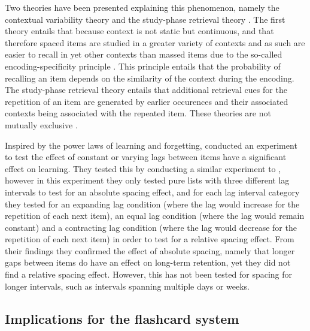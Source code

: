 Two theories have been presented explaining this phenomenon, namely the contextual variability theory and the study-phase retrieval theory \cite{siegel}. The first theory entails that because context is not static but continuous, and that therefore spaced items are studied in a greater variety of contexts and as such are easier to recall in yet other contexts than massed items due to the so-called encoding-specificity principle \cite{cognitivepsychology}. This principle entails that the probability of recalling an item depends on the similarity of the context during the encoding. The study-phase retrieval theory entails that additional retrieval cues for the repetition of an item are generated by earlier occurences and their associated contexts being associated with the repeated item. These theories are not mutually exclusive \cite{siegel}.

Inspired by the power laws of learning and forgetting,  conducted an experiment to test the effect of constant or varying lags between items have a significant effect on learning. They tested this by conducting a similar experiment to , however in this experiment they only tested pure lists with three different lag intervals to test for an absolute spacing effect, and for each lag interval category they tested for an expanding lag condition (where the lag would increase for the repetition of each next item), an equal lag condition (where the lag would remain constant) and a contracting lag condition (where the lag would decrease for the repetition of each next item) in order to test for a relative spacing effect. From their findings they confirmed the effect of absolute spacing, namely that longer gaps between items do have an effect on long-term retention, yet they did not find a relative spacing effect. However, this has not been tested for spacing for longer intervals, such as intervals spanning multiple days or weeks.

\subsection{Implications for the flashcard system}

